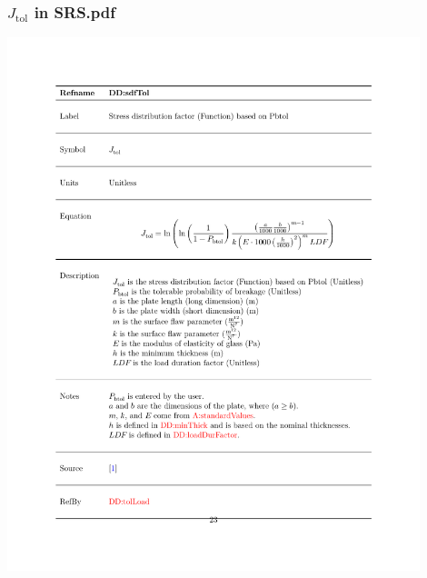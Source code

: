\documentclass[usenames]{beamer}
\begin{document}
\begin{frame}

\frametitle{$J_{\mbox{tol}}$ in SRS.pdf}
\begin{center}
\includegraphics[width=0.9\textwidth]{../figures/Jtol_pdf.pdf}
\end{center}
\end{frame}
\end{document}

